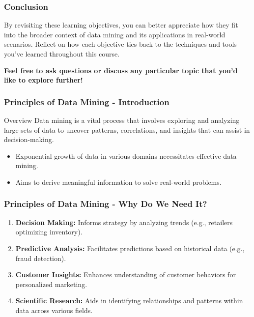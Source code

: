 \documentclass[aspectratio=169]{beamer}
\begin{document}
\begin{frame}[fragile]
    \frametitle{Conclusion}
    By revisiting these learning objectives, you can better appreciate how they fit into the broader context of data mining and its applications in real-world scenarios. 
    Reflect on how each objective ties back to the techniques and tools you've learned throughout this course.
    
    \textbf{Feel free to ask questions or discuss any particular topic that you'd like to explore further!}
\end{frame}

\begin{frame}[fragile]
    \frametitle{Principles of Data Mining - Introduction}
    \begin{block}{Overview}
        Data mining is a vital process that involves exploring and analyzing large sets of data to uncover patterns, correlations, and insights that can assist in decision-making. 
    \end{block}
    \begin{itemize}
        \item Exponential growth of data in various domains necessitates effective data mining.
        \item Aims to derive meaningful information to solve real-world problems.
    \end{itemize}
\end{frame}

\begin{frame}[fragile]
    \frametitle{Principles of Data Mining - Why Do We Need It?}
    \begin{enumerate}
        \item \textbf{Decision Making:} Informs strategy by analyzing trends (e.g., retailers optimizing inventory).
        \item \textbf{Predictive Analysis:} Facilitates predictions based on historical data (e.g., fraud detection).
        \item \textbf{Customer Insights:} Enhances understanding of customer behaviors for personalized marketing.
        \item \textbf{Scientific Research:} Aids in identifying relationships and patterns within data across various fields.
    \end{enumerate}
\end{frame}
\end{document}
